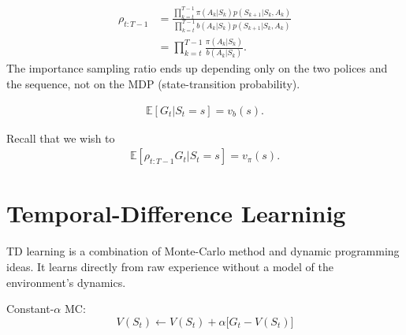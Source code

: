 \begin{align*}
	\rho_{t:T-1} &=  \frac{\prod_{k=t}^{T-1}\pi(A_k|S_k)p(S_{k+1}|S_k,A_k)}{ \prod_{k=t}^{T-1}b(A_k|S_k)p(S_{k+1}|S_k,A_k)}\\
	&= \prod_{k=t}^{T-1}\frac{\pi(A_k|S_k)}{b(A_k|S_k)}.
	\label{eq:importance_sampling_ratio}
\end{align*}
The importance sampling ratio ends up depending only on the two polices and the sequence, not on the MDP (state-transition probability).

\begin{align*}
	\mathbb{E}[G_t|S_t=s] = v_b(s).
\end{align*}

Recall that we wish to 
\begin{align*}
	\mathbb{E}[\rho_{t:T-1} G_t|S_t=s] = v_\pi(s).
\end{align*}

%


\section{Temporal-Difference Learninig}

TD learning is a combination of Monte-Carlo method and dynamic programming ideas. It learns directly from raw experience without a model of the environment's dynamics. 


Constant-$\alpha$ MC:
$$V(S_t) \leftarrow V(S_t)+ \alpha \Big[G_t-V(S_t)\Big] $$

